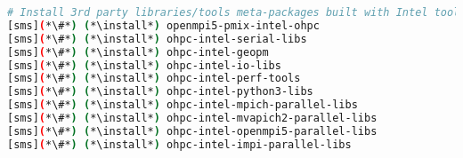 
\begin{lstlisting}[language=bash,keywords={},upquote=true,keepspaces]
# Install 3rd party libraries/tools meta-packages built with Intel toolchain
[sms](*\#*) (*\install*) openmpi5-pmix-intel-ohpc
[sms](*\#*) (*\install*) ohpc-intel-serial-libs
[sms](*\#*) (*\install*) ohpc-intel-geopm
[sms](*\#*) (*\install*) ohpc-intel-io-libs
[sms](*\#*) (*\install*) ohpc-intel-perf-tools
[sms](*\#*) (*\install*) ohpc-intel-python3-libs
[sms](*\#*) (*\install*) ohpc-intel-mpich-parallel-libs
[sms](*\#*) (*\install*) ohpc-intel-mvapich2-parallel-libs
[sms](*\#*) (*\install*) ohpc-intel-openmpi5-parallel-libs
[sms](*\#*) (*\install*) ohpc-intel-impi-parallel-libs
\end{lstlisting}

